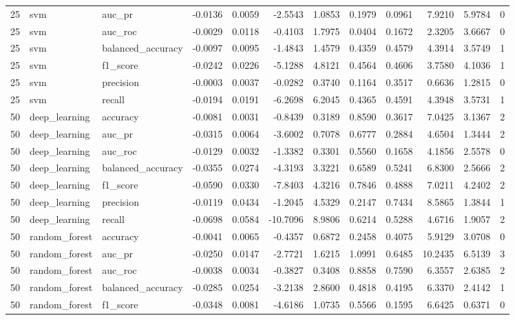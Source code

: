 \begin{tabular}{rllrrrrrrrrl}
25 & svm & auc_pr & -0.0136 & 0.0059 & -2.5543 & 1.0853 & 0.1979 & 0.0961 & 7.9210 & 5.9784 & 0 \\
25 & svm & auc_roc & -0.0029 & 0.0118 & -0.4103 & 1.7975 & 0.0404 & 0.1672 & 2.3205 & 3.6667 & 0 \\
25 & svm & balanced_accuracy & -0.0097 & 0.0095 & -1.4843 & 1.4579 & 0.4359 & 0.4579 & 4.3914 & 3.5749 & 1 \\
25 & svm & f1_score & -0.0242 & 0.0226 & -5.1288 & 4.8121 & 0.4564 & 0.4606 & 3.7580 & 4.1036 & 1 \\
25 & svm & precision & -0.0003 & 0.0037 & -0.0282 & 0.3740 & 0.1164 & 0.3517 & 0.6636 & 1.2815 & 0 \\
25 & svm & recall & -0.0194 & 0.0191 & -6.2698 & 6.2045 & 0.4365 & 0.4591 & 4.3948 & 3.5731 & 1 \\
50 & deep_learning & accuracy & -0.0081 & 0.0031 & -0.8439 & 0.3189 & 0.8590 & 0.3617 & 7.0425 & 3.1367 & 2 \\
50 & deep_learning & auc_pr & -0.0315 & 0.0064 & -3.6002 & 0.7078 & 0.6777 & 0.2884 & 4.6504 & 1.3444 & 2 \\
50 & deep_learning & auc_roc & -0.0129 & 0.0032 & -1.3382 & 0.3301 & 0.5560 & 0.1658 & 4.1856 & 2.5578 & 0 \\
50 & deep_learning & balanced_accuracy & -0.0355 & 0.0274 & -4.3193 & 3.3221 & 0.6589 & 0.5241 & 6.8300 & 2.5666 & 2 \\
50 & deep_learning & f1_score & -0.0590 & 0.0330 & -7.8403 & 4.3216 & 0.7846 & 0.4888 & 7.0211 & 4.2402 & 2 \\
50 & deep_learning & precision & -0.0119 & 0.0434 & -1.2045 & 4.5329 & 0.2147 & 0.7434 & 8.5865 & 1.3844 & 1 \\
50 & deep_learning & recall & -0.0698 & 0.0584 & -10.7096 & 8.9806 & 0.6214 & 0.5288 & 4.6716 & 1.9057 & 2 \\
50 & random_forest & accuracy & -0.0041 & 0.0065 & -0.4357 & 0.6872 & 0.2458 & 0.4075 & 5.9129 & 3.0708 & 0 \\
50 & random_forest & auc_pr & -0.0250 & 0.0147 & -2.7721 & 1.6215 & 1.0991 & 0.6485 & 10.2435 & 6.5139 & 3 \\
50 & random_forest & auc_roc & -0.0038 & 0.0034 & -0.3827 & 0.3408 & 0.8858 & 0.7590 & 6.3557 & 2.6385 & 2 \\
50 & random_forest & balanced_accuracy & -0.0285 & 0.0254 & -3.2138 & 2.8600 & 0.4818 & 0.4195 & 6.3370 & 2.4142 & 1 \\
50 & random_forest & f1_score & -0.0348 & 0.0081 & -4.6186 & 1.0735 & 0.5566 & 0.1595 & 6.6425 & 0.6371 & 0 \\

\end{tabular}
